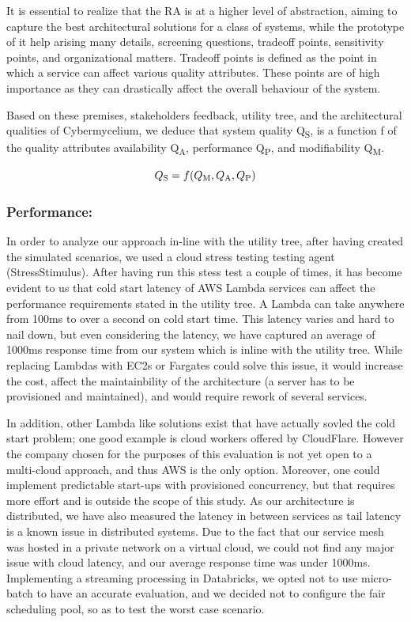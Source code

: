\documentclass[review]{elsarticle}
\begin{document}
It is essential to realize that the RA is at a higher level of abstraction, aiming to capture the best architectural solutions for a class of systems, while the prototype of it help arising many details, screening questions, tradeoff points, sensitivity points, and organizational matters. Tradeoff points is defined as the point in which a service can affect various quality attributes. These points are of high importance as they can drastically affect the overall behaviour of the system.

Based on these premises, stakeholders feedback, utility tree, and the architectural qualities of Cybermycelium, we deduce that system quality Q\textsubscript{S}, is a function f of the quality attributes availability Q\textsubscript{A}, performance Q\textsubscript{P}, and modifiability Q\textsubscript{M}.

\begin{equation}
    Q\textsubscript{S} = f(Q\textsubscript{M}, Q\textsubscript{A}, Q\textsubscript{P})
\end{equation}

\subsubsection{Performance:} In order to analyze our approach in-line with the utility tree, after having created the simulated scenarios, we used a cloud stress testing testing agent (StressStimulus). After having run this stess test a couple of times, it has become evident to us that cold start latency of AWS Lambda services can affect the performance requirements stated in the utility tree. A Lambda can take anywhere from 100ms to over a second on cold start time. This latency varies and hard to nail down, but even considering the latency, we have captured an average of 1000ms response time from our system which is inline with the utility tree. While replacing Lambdas with EC2s or Fargates could solve this issue, it would increase the cost, affect the maintainbility of the architecture (a server has to be provisioned and maintained), and would require rework of several services.

In addition, other Lambda like solutions exist that have actually sovled the cold start problem; one good example is cloud workers offered by CloudFlare. However the company chosen for the purposes of this evaluation is not yet open to a multi-cloud approach, and thus AWS is the only option. Moreover, one could implement predictable start-ups with provisioned concurrency, but that requires more effort and is outside the scope of this study. As our architecture is distributed, we have also measured the latency in between services as tail latency is a known issue in distributed systems. Due to the fact that our service mesh was hosted in a private network on a virtual cloud, we could not find any major issue with cloud latency, and our average response time was under 1000ms. Implementing a streaming processing in Databricks, we opted not to use micro-batch to have an accurate evaluation, and we decided not to configure the fair scheduling pool, so as to test the worst case scenario.
\end{document}
